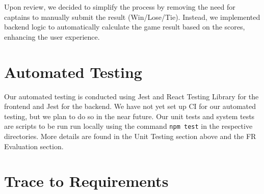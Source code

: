 \documentclass[12pt, titlepage]{article}
\begin{document}
Upon review, we decided to simplify the process by removing the need for captains to manually submit the result (Win/Lose/Tie). Instead, we implemented backend logic to automatically calculate the game result based on the scores, enhancing the user experience.

\section{Automated Testing}

Our automated testing is conducted using Jest and React Testing Library for the frontend and Jest for the backend. 
We have not yet set up CI for our automated testing, but we plan to do so in the near future.
Our unit tests and system tests are scripts to be run run locally using the command \texttt{npm test} in the respective directories.
More details are found in the Unit Testing section above and the FR Evaluation section.	

\newpage

\section{Trace to Requirements}
\end{document}
